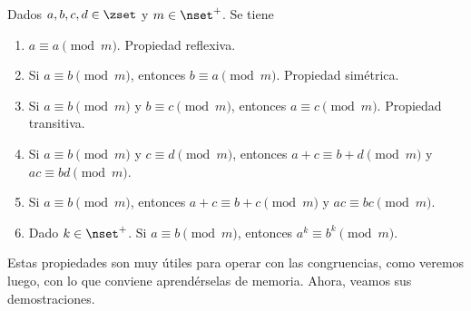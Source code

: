 \begin{theorem}
  Dados $a, b, c, d \in \zset$ y $m \in \nset^{+}$. Se tiene

  \begin{enumerate}
    \item $a \equiv a \pmod m$. Propiedad reflexiva.
    \item Si $a \equiv b \pmod m$, entonces $b \equiv a \pmod m$. Propiedad
      simétrica.
    \item Si $a \equiv b \pmod m$ y $b \equiv c \pmod m$, entonces $a \equiv
      c \pmod m$. Propiedad transitiva.
    \item Si $a \equiv b \pmod m$ y $c \equiv d \pmod m$, entonces $a+c
      \equiv b+d \pmod m$ y $ac \equiv bd \pmod m$.
    \item Si $a \equiv b \pmod m$, entonces $a+c \equiv b+c \pmod m$ y $ac
      \equiv bc \pmod m$.
    \item Dado $k \in \nset^{+}$. Si $a \equiv b \pmod m$, entonces $a^k
      \equiv b^k \pmod m$.
  \end{enumerate}
\end{theorem}

Estas propiedades son muy útiles para operar con las congruencias, como
veremos luego, con lo que conviene aprendérselas de memoria. Ahora, veamos
sus demostraciones.

